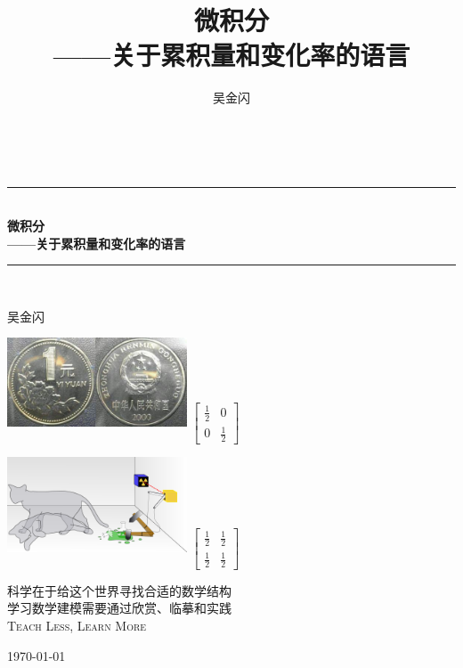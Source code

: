 \documentclass{ctexbook}
\newcommand{\HRule}{\rule{\linewidth}{0.5mm}}
\begin{document}
\title{微积分\\
——关于累积量和变化率的语言}
\author{吴金闪}

\begin{titlepage}
\begin{center}

~

\HRule \\[0.4cm]
{ \huge \bfseries 微积分\\
——关于累积量和变化率的语言 \\[0.4cm] }
\HRule \\[0.5cm]

\begin{center} \Large
吴金闪
\end{center}
\vspace{1cm}
	
\includegraphics[width=0.4\textwidth]{figure/coin} \hspace{2cm} $\begin{bmatrix}\frac{1}{2} & 0 \\
0 & \frac{1}{2} \end{bmatrix}$

\includegraphics[width=0.4\textwidth]{figure/schrodingerscat} \hspace{2cm} $\begin{bmatrix}\frac{1}{2} & \frac{1}{2} \\
\frac{1}{2} & \frac{1}{2}\end{bmatrix}$

\vspace{1cm}

\textsc{\Large 科学在于给这个世界寻找合适的数学结构}\\[0.5cm]

\textsc{\Large 学习数学建模需要通过欣赏、临摹和实践}\\[0.5cm]
	
\textsc{\Large Teach Less, Learn More}\\[0.5cm]
	
\vfill

{\large \today}

\end{center}
\end{titlepage}
\end{document}
